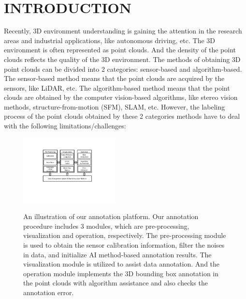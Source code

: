 \documentclass[letterpaper, 10 pt, conference]{ieeeconf}  %
\begin{document}
\section{INTRODUCTION}
Recently, 3D environment understanding is gaining the attention in the research areas and industrial applications, like autonomous driving, etc. The 3D environment is often represented as point clouds. And the density of the point clouds reflects the quality of the 3D environment. The methods of obtaining 3D point clouds can be divided into 2 categories: sensor-based and algorithm-based. The sensor-based method means that the point clouds are acquired by the sensors, like LiDAR, etc. The algorithm-based method means that the point clouds are obtained by the computer vision-based algorithms, like stereo vision methods, structure-from-motion (SFM), SLAM, etc. However, the labeling process of the point clouds obtained by these 2 categories methods have to deal with the following limitations/challenges:
\begin{figure}[htbp]
 \centering
 \includegraphics[width=0.45\textwidth]{./figures/arch}\\ %
  \caption{An illustration of our annotation platform. Our annotation procedure includes 3 modules, which are pre-processing, visualization and operation, respectively. The pre-processing module is used to obtain the sensor calibration information, filter the noises in data, and initialize AI method-based annotation results. The visualization module is utilized to assist data annotation. And the operation module implements the 3D bounding box annotation in the point clouds with algorithm assistance and also checks the annotation error.}
     \label{fig:main_ui}
     \vspace{-0.3cm}
\end{figure}
\end{document}
